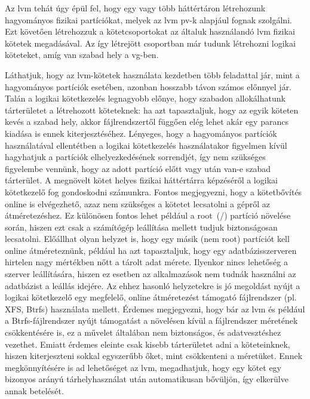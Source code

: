 Az \gls{lvm} tehát úgy épül fel, hogy egy vagy több háttértáron létrehozunk hagyományos fizikai partíciókat, melyek az \gls{lvm} \acrshort{pv}-k alapjául fognak szolgálni. Ezt követően létrehozzuk a kötetcsoportokat az általuk használandó \acrshort{lvm} fizikai kötetek megadásával. Az így létrejött csoportban már tudunk létrehozni logikai köteteket, amíg van szabad hely a \acrshort{vg}-ben.

Láthatjuk, hogy az \acrshort{lvm}-kötetek használata kezdetben több feladattal jár, mint a hagyományos partíciók esetében, azonban hosszabb távon számos előnnyel jár. Talán a logikai kötetkezelés legnagyobb előnye, hogy szabadon allokálhatunk tárterületet a létrehozott köteteknek: ha azt tapasztaljuk, hogy az egyik köteten kevés a szabad hely, akkor fájlrendszertől függően elég lehet akár egy parancs kiadása is ennek kiterjesztéséhez. Lényeges, hogy a hagyományos partíciók használatával ellentétben a logikai kötetkezelés használatakor figyelmen kívül hagyhatjuk a partíciók elhelyezkedésének sorrendjét, így nem szükséges figyelembe vennünk, hogy az adott partíció előtt vagy után van-e szabad tárterület. A megnövelt kötet helyes fizikai háttértárra képzéséről a logikai kötetkezelő fog gondoskodni számunkra. Fontos megjegyezni, hogy a kötetbővítés online is elvégezhető, azaz nem szükséges a kötetet lecsatolni a gépről az átméretezéshez. Ez különösen fontos lehet például a root~(/) partíció növelése során, hiszen ezt csak a számítógép leállítása mellett tudjuk biztonságosan lecsatolni. Előállhat olyan helyzet is, hogy egy másik (nem root) partíciót kell online átméreteznünk, például ha azt tapasztaljuk, hogy egy adatbázisszerveren hirtelen nagy mértékben nőtt a tárolt adat mérete. Ilyenkor nincs lehetőség a szerver leállítására, hiszen ez esetben az alkalmazások nem tudnák használni az adatbázist a leállás idejére. Az ehhez hasonló helyzetekre is jó megoldást nyújt a logikai kötetkezelő egy megfelelő, online átméretezést támogató fájlrendszer (pl. XFS, Btrfs) használata mellett. Érdemes megjegyezni, hogy bár az \acrshort{lvm} és például a Btrfs-fájlrendszer nyújt támogatást a növelésen kívül a fájlrendszer méretének csökkentésére is, ez a művelet általában nem biztonságos, és adatvesztéshez vezethet. Emiatt érdemes eleinte csak kisebb tárterületet adni a köteteinknek, hiszen kiterjeszteni sokkal egyszerűbb őket, mint csökkenteni a méretüket. Ennek megkönnyítésére is ad lehetőséget az \acrshort{lvm}, megadhatjuk, hogy egy kötet egy bizonyos arányú tárhelyhasználat után automatikusan bővüljön, így elkerülve annak betelését.

